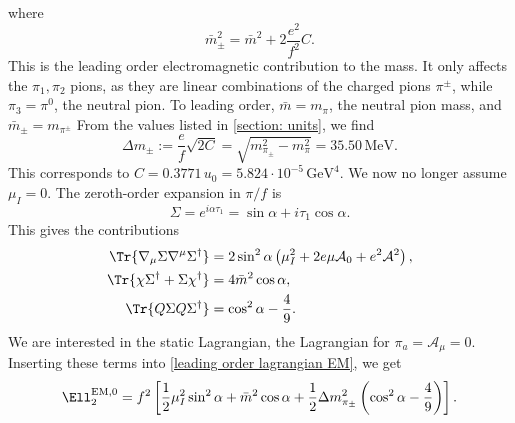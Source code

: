 \documentclass{book}
\begin{document}
%
where
\begin{equation}
    \bar m_\pm^2 = \bar m^2 + 2\frac{e^2}{f^2}C.
\end{equation}
%
This is the leading order electromagnetic contribution to the mass.
It only affects the $\pi_1, \pi_2$ pions, as they are linear combinations of the charged pions $\pi^\pm$, while $\pi_3 = \pi^0$, the neutral pion.
To leading order, $\bar m = m_\pi$, the neutral pion mass, and $\bar m_{\pm} = m_{\pi^{\pm}}$
From the values listed in \autoref{section: units}, we find
%
\begin{equation}
    \label{EM mass contribtuion leading order}
    \Delta m_{\pm} := \frac{e}{f}\sqrt{2C} = \sqrt{m_{\pi_\pm}^2 - m_{\pi}^2} = 35.50 \, \text{MeV}.
\end{equation}
%
This corresponds to $C = 0.3771 \, u_0 = 5.824 \cdot 10^{-5} \, \text{GeV}^4$.
We now no longer assume $\mu_I = 0$.
The zeroth-order expansion in $\pi/f$ is
%
\begin{equation}
    \Sigma = e^{i \alpha \tau_1} = \sin \alpha + i \tau_1 \cos \alpha.
\end{equation}
%
This gives the contributions
%
\begin{align}
    \Tr{\nabla_\mu \Sigma \nabla^\mu \Sigma^\dagger}
    & = 2 \sin^2\alpha\left(\mu_I^2 + 2 e \mu \mathcal A_0 + e^2\mathcal A^2 \right), \\
    \Tr{\chi \Sigma^\dagger + \Sigma \chi^\dagger}
    & =4 \bar m^2 \cos \alpha,\\
    \Tr{Q \Sigma Q \Sigma^\dagger}
    & =  \cos^2 \alpha - \frac{4}{9}.
\end{align}
%
We are interested in the static Lagrangian, the Lagrangian for $\pi_a = \mathcal A_\mu = 0$.
Inserting these terms into \autoref{leading order lagrangian EM}, we get
%
\begin{equation}
    \label{static lagrangian with EM}
    \Ell^{\text{EM}, 0}_2
    = f^2 \left[
        \frac{1}{2}\mu_I^2 \sin^2 \alpha + \bar m^2 \cos \alpha 
        + \frac{1}{2} \Delta m^2_{\pi_\pm} \left(\cos^2 \alpha - \frac{4}{9}\right)
    \right].
\end{equation}
%
\end{document}
